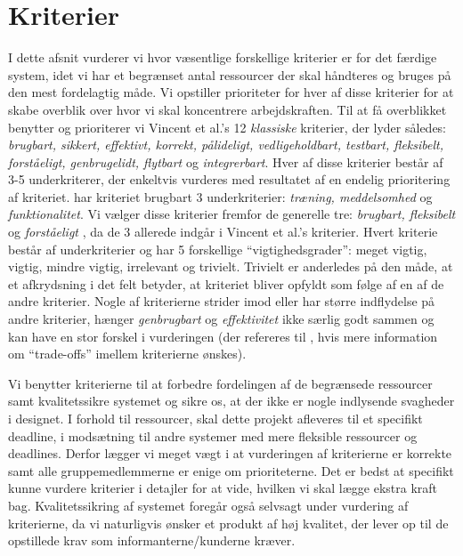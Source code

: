 \section{Kriterier}
I dette afsnit vurderer vi hvor væsentlige forskellige kriterier er for det færdige system, idet vi har et begrænset antal ressourcer der skal håndteres og bruges på den mest fordelagtig måde. Vi opstiller prioriteter for hver af disse kriterier for at skabe overblik over hvor vi skal koncentrere arbejdskraften. Til at få overblikket benytter og prioriterer vi Vincent et al.'s 12 \emph{klassiske} kriterier, der lyder således: \emph{brugbart, sikkert, effektivt, korrekt, pålideligt, vedligeholdbart, testbart, fleksibelt, forståeligt, genbrugelidt, flytbart} og \emph{integrerbart}. Hver af disse kriterier består af 3-5 underkriterer, der enkeltvis vurderes med resultatet af en endelig prioritering af kriteriet. \Fx har kriteriet brugbart 3 underkriterier: \emph{træning, meddelsomhed} og \emph{funktionalitet}. Vi vælger disse kriterier fremfor de generelle tre: \emph{brugbart, fleksibelt} og \emph{forståeligt} \cite{crit}, da de 3 allerede indgår i Vincent et al.'s kriterier. Hvert kriterie består af underkriterier og har 5 forskellige ``vigtighedsgrader'': meget vigtig, vigtig, mindre vigtig, irrelevant og trivielt. Trivielt er anderledes på den måde, at et afkrydsning i det felt betyder, at kriteriet bliver opfyldt som følge af en af de andre kriterier. Nogle af kriterierne strider imod eller har større indflydelse på andre kriterier, \fx hænger \emph{genbrugbart} og \emph{effektivitet} ikke særlig godt sammen og kan have en stor forskel i vurderingen (der refereres til \cite[s.~18]{crit}, hvis mere information om ``trade-offs'' imellem kriterierne ønskes).

Vi benytter kriterierne til at forbedre fordelingen af de begrænsede ressourcer samt kvalitetssikre systemet og sikre os, at der ikke er nogle indlysende svagheder i designet. I forhold til ressourcer, skal dette projekt afleveres til et specifikt deadline, i modsætning til andre systemer med mere fleksible ressourcer og deadlines. Derfor lægger vi meget vægt i at vurderingen af kriterierne er korrekte samt alle gruppemedlemmerne er enige om prioriteterne. Det er bedst at specifikt kunne vurdere kriterier i detajler for at vide, hvilken vi skal lægge ekstra kraft bag. Kvalitetssikring af systemet foregår også selvsagt under vurdering af kriterierne, da vi naturligvis ønsker et produkt af høj kvalitet, der lever op til de opstillede krav som informanterne/kunderne kræver.

